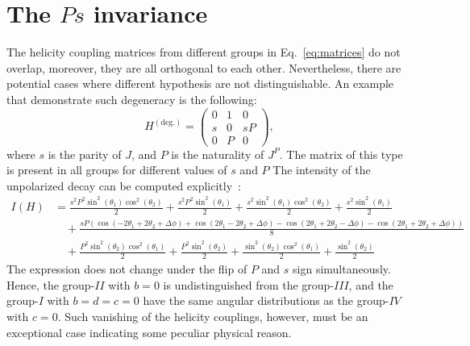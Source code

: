 \documentclass[prd,preprintnumbers,floatfix,
nofootinbib,superscriptaddress]{revtex4}
\newcommand{\I}{\ensuremath{I}}
\newcommand{\II}{\ensuremath{{I\!I}}}
\newcommand{\III}{\ensuremath{{I\!I\!I}}}
\newcommand{\IV}{\ensuremath{{I\!V}}}
\begin{document}
\section{The $P s$ invariance} \label{sec:Ps.invariance}
The helicity coupling matrices from different groups in Eq.~\eqref{eq:matrices} do not overlap,
moreover, they are all orthogonal to each other.
Nevertheless, there are potential cases where different hypothesis are not distinguishable.
An example that demonstrate such degeneracy is the following:
\begin{equation}
  H^{(\text{deg.})} = \begin{pmatrix}
    0 &1 &0 \\
    s & 0 &sP \\
    0 &P &0
  \end{pmatrix},
\end{equation}
where $s$ is the parity of $J$, and $P$ is the naturality of $J^P$.
The matrix of this type is present in all groups for different values of $s$ and $P$
The intensity of the unpolarized decay can be computed explicitly~\cite{SymPy}:
\begin{align}
  I(H) &= \frac{s^{2} P^{2} \sin^{2}{\left (\theta_{1} \right )} \cos^{2}{\left (\theta_{2} \right )}}{2} + \frac{s^{2} P^{2} \sin^{2}{\left (\theta_{1} \right )}}{2} + \frac{s^{2} \sin^{2}{\left (\theta_{1} \right )} \cos^{2}{\left (\theta_{2} \right )}}{2} + \frac{s^{2} \sin^{2}{\left (\theta_{1} \right )}}{2} \\ \nonumber
   &\quad + \frac{s P \left(\cos{\left (- 2 \theta_{1} + 2 \theta_{2} + \Delta\phi \right )} + \cos{\left (2 \theta_{1} - 2 \theta_{2} + \Delta\phi \right )} - \cos{\left (2 \theta_{1} + 2 \theta_{2} - \Delta\phi \right )} - \cos{\left (2 \theta_{1} + 2 \theta_{2} + \Delta\phi \right )}\right)}{8}\\ \nonumber
   &\quad+\frac{P^{2} \sin^{2}{\left (\theta_{2} \right )} \cos^{2}{\left (\theta_{1} \right )}}{2} + \frac{P^{2} \sin^{2}{\left (\theta_{2} \right )}}{2} + \frac{\sin^{2}{\left (\theta_{2} \right )} \cos^{2}{\left (\theta_{1} \right )}}{2} + \frac{\sin^{2}{\left (\theta_{2} \right )}}{2}
\end{align}
The expression does not change under the flip of $P$ and $s$ sign simultaneously.
Hence, the group-$\II$ with $b=0$ is undistinguished from the group-$\III$,
and the group-$\I$ with $b=d=c=0$ have the same angular distributions as the group-$\IV$ with $c=0$.
Such vanishing of the helicity couplings, however, must be an exceptional case indicating some peculiar physical reason.


\end{document}
